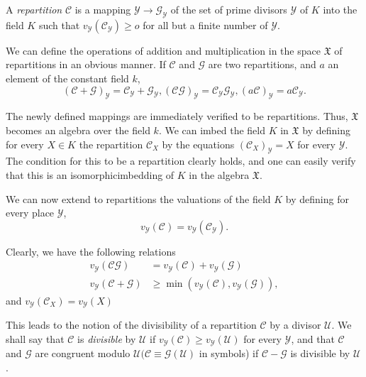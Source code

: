 \begin{defi*}%
  A {\em repartition} $\mathscr{C}$ is a mapping $\mathscr{Y} \to
  \mathscr{G}_\mathscr{Y}$ of the set of prime divisors $\mathscr{Y}$
  of $K$ into the field $K$ such that $v_\mathscr{Y}
  (\mathscr{C}_\mathscr{Y}) \ge o$ for all but a finite number of
  $\mathscr{Y}$. 
\end{defi*}  
  
 We can define the operations of addition and multiplication in the
 space $\mathfrak{X}$ of repartitions in an obvious manner. If
 $\mathscr{C}$ and $\mathscr{G}$ are two repartitions, and $a$ an
 element of the constant field $k$, 
 $$
 (\mathscr{C}  + \mathscr{G})_\mathscr{Y} = \mathscr{C}_\mathscr{Y} +
 \mathscr{G}_\mathscr{Y} , (\mathscr{C} \mathscr{G})_\mathscr{Y} =
 \mathscr{C}_\mathscr{Y} \mathscr{G}_\mathscr{Y} , (a \mathscr{C}
 )_\mathscr{Y} = a \mathscr{C}_\mathscr{Y} . 
 $$
 
  The newly defined mappings are immediately verified to be
  repartitions. Thus, $\mathfrak{X}$ becomes an algebra over the field
  $k$. We can imbed the field $K$ in $\mathfrak{X}$ by defining for
  every $X \in K$ the repartition $\mathscr{C}_X$ by the equations
  $(\mathscr{C}_X)_\mathscr{Y} = X$ for every $\mathscr{Y}$. The
  condition for this to be a repartition clearly holds, and one can
  easily verify that this is an isomorphic\pageoriginale imbedding of $K$ in the
  algebra $\mathfrak{X}$. 
  
 We can now extend to repartitions the valuations of the field $K$ by
 defining for every place $\mathscr{Y}$, 
 $$
 v_\mathscr{Y}(\mathscr{C}) = v_\mathscr{Y} (\mathscr{C}_\mathscr{Y}).
 $$
 
Clearly, we have the following relations
\begin{align*}
  v_\mathscr{Y} (\mathscr{C} \mathscr{G}) 
  & = v_\mathscr{Y} (\mathscr{C}) + v_\mathscr{Y} (\mathscr{G} )\\ 
  v_\mathscr{Y}(\mathscr{C} + \mathscr{G}) 
  & \ge \min (v_\mathscr{Y}  (\mathscr{C}), v_\mathscr{Y} (\mathscr{G} )) , 
\end{align*} 
 and $v_{\mathscr{Y}} (\mathscr{C}_X) = v_\mathscr{Y} (X)$
 
 This leads to the notion of the divisibility of a repartition
 $\mathscr{C}$ by a divisor $\mathscr{U}$. We shall say that
 $\mathscr{C}$ is \textit{divisible} by $\mathscr{U}$ if $v_\mathscr{Y}
 (\mathscr{C}) \ge v_\mathscr{Y} (\mathscr{U})$ for every
 $\mathscr{Y}$, and that $\mathscr{C}$ and $\mathscr{G}$ are
 congruent modulo $\mathscr{U} (\mathscr{C} \equiv \mathscr{G}
 (\mathscr{U}) $ in symbols) if $\mathscr{C} - \mathscr{G}$ is
 divisible by $\mathscr{U}$. 
 
